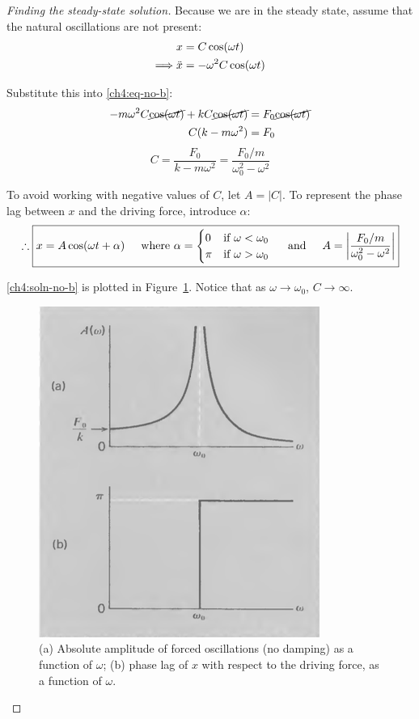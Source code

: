 \begin{proof}[Finding the steady-state solution]
Because we are in the steady state, assume that the natural oscillations are not present:
\begin{align}
	x &= C\cos(\omega t) \notag \\
	\Longrightarrow
	\ddot{x} &= -\omega^2 C\cos(\omega t)	\label{ch4:eq-acc-forced-no-b}
\end{align}

Substitute this into \eqref{ch4:eq-no-b}:
\begin{align*}
	-m\omega^2 C\cancel{\cos(\omega t)} + kC\cancel{\cos(\omega t)} &= F_0\cancel {\cos(\omega t)} \\
	C(k-m\omega^2) &= F_0
\end{align*}
\begin{equation*}
	 C = \frac{F_0}{k-m\omega^2} = \frac{F_0/m}{\omega_0^2-\omega^2} 
\end{equation*}

To avoid working with negative values of $C$, let $A=|C|$. To represent the phase lag between $x$ and the driving force, introduce $\alpha$:
\begin{equation}
	\therefore
	\boxed{
	x = A \cos(\omega t + \alpha) 
	\hspace{0.5cm}\text{where }
	\alpha = 
	\begin{cases}
		0 & \text{if } \omega<\omega_0 \\
		\pi & \text{if } \omega>\omega_0
	\end{cases}
	\hspace{0.5cm}\text{and}\hspace{0.5cm}
	A = \left| \frac{F_0/m}{\omega_0^2-\omega^2}  \right| 
	}
	\label{ch4:soln-no-b}
\end{equation}

\eqref{ch4:soln-no-b} is plotted in Figure~\ref{ch4:no-damping-A}. Notice that as $\omega\to\omega_0$, $C\to \infty$.

\begin{figure}[h]
	\centering
	\includegraphics[scale=0.7]{phys232/Ch4-forced-no-damping-A.png} \caption{(a) Absolute amplitude of forced oscillations (no damping) as a function of $\omega$; (b) phase lag of $x$ with respect to the driving force, as a function of $\omega$.}	\label{ch4:no-damping-A}
\end{figure}
\end{proof}

